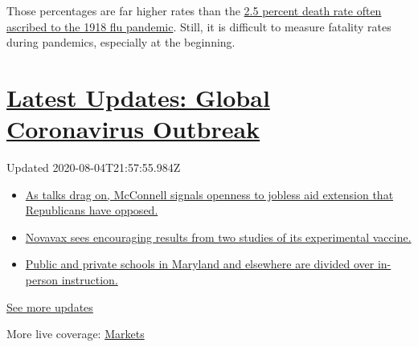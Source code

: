 Those percentages are far higher rates than the
\href{https://wwwnc.cdc.gov/eid/article/12/1/05-0979_article}{2.5
percent death rate often ascribed to the 1918 flu pandemic}. Still, it
is difficult to measure fatality rates during pandemics, especially at
the beginning.

\hypertarget{latest-updates-global-coronavirus-outbreak}{%
\section{\texorpdfstring{\href{https://www.nytimes3xbfgragh.onion/2020/08/04/world/coronavirus-cases.html?action=click\&pgtype=Article\&state=default\&region=MAIN_CONTENT_1\&context=storylines_live_updates}{Latest
Updates: Global Coronavirus
Outbreak}}{Latest Updates: Global Coronavirus Outbreak}}\label{latest-updates-global-coronavirus-outbreak}}

Updated 2020-08-04T21:57:55.984Z

\begin{itemize}
\tightlist
\item
  \href{https://www.nytimes3xbfgragh.onion/2020/08/04/world/coronavirus-cases.html?action=click\&pgtype=Article\&state=default\&region=MAIN_CONTENT_1\&context=storylines_live_updates\#link-2daa96b5}{As
  talks drag on, McConnell signals openness to jobless aid extension
  that Republicans have opposed.}
\item
  \href{https://www.nytimes3xbfgragh.onion/2020/08/04/world/coronavirus-cases.html?action=click\&pgtype=Article\&state=default\&region=MAIN_CONTENT_1\&context=storylines_live_updates\#link-1228a480}{Novavax
  sees encouraging results from two studies of its experimental
  vaccine.}
\item
  \href{https://www.nytimes3xbfgragh.onion/2020/08/04/world/coronavirus-cases.html?action=click\&pgtype=Article\&state=default\&region=MAIN_CONTENT_1\&context=storylines_live_updates\#link-4825b93}{Public
  and private schools in Maryland and elsewhere are divided over
  in-person instruction.}
\end{itemize}

\href{https://www.nytimes3xbfgragh.onion/2020/08/04/world/coronavirus-cases.html?action=click\&pgtype=Article\&state=default\&region=MAIN_CONTENT_1\&context=storylines_live_updates}{See
more updates}

More live coverage:
\href{https://www.nytimes3xbfgragh.onion/live/2020/08/04/business/stock-market-today-coronavirus?action=click\&pgtype=Article\&state=default\&region=MAIN_CONTENT_1\&context=storylines_live_updates}{Markets}

